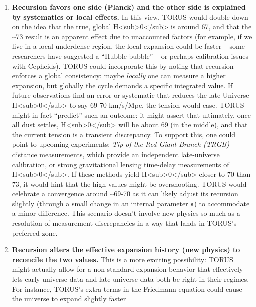 \documentclass[]{article}
\begin{document}
\begin{enumerate}
\def\labelenumi{\arabic{enumi}.}
\item
  \textbf{Recursion favors one side (Planck) and the other side is
  explained by systematics or local effects.} In this view, TORUS would
  double down on the idea that the true, global
  H\textless{}sub\textgreater{}0\textless{}/sub\textgreater{} is around
  67, and that the \textasciitilde{}73 result is an apparent effect due
  to unaccounted factors (for example, if we live in a local underdense
  region, the local expansion could be faster -- some researchers have
  suggested a ``Hubble bubble'' -- or perhaps calibration issues with
  Cepheids). TORUS could incorporate this by noting that recursion
  enforces a global consistency: maybe \emph{locally} one can measure a
  higher expansion, but globally the cycle demands a specific integrated
  value. If future observations find an error or systematic that reduces
  the late-Universe
  H\textless{}sub\textgreater{}0\textless{}/sub\textgreater{} to say
  69-70 km/s/Mpc, the tension would ease. TORUS might in fact
  ``predict'' such an outcome: it might assert that ultimately, once all
  dust settles,
  H\textless{}sub\textgreater{}0\textless{}/sub\textgreater{} will be
  about 69 (in the middle)​, and that the current tension is a transient
  discrepancy. To support this, one could point to upcoming experiments:
  \emph{Tip of the Red Giant Branch (TRGB)} distance measurements, which
  provide an independent late-universe calibration, or strong
  gravitational lensing time-delay measurements of
  H\textless{}sub\textgreater{}0\textless{}/sub\textgreater{}. If these
  methods yield
  H\textless{}sub\textgreater{}0\textless{}/sub\textgreater{} closer to
  70 than 73, it would hint that the high values might be overshooting.
  TORUS would celebrate a convergence around \textasciitilde{}69-70 as
  it can likely adjust its recursion slightly (through a small change in
  an internal parameter κ) to accommodate a minor difference​. This
  scenario doesn't involve new physics so much as a resolution of
  measurement discrepancies in a way that lands in TORUS's preferred
  zone.
\item
  \textbf{Recursion alters the effective expansion history (new physics)
  to reconcile the two values.} This is a more exciting possibility:
  TORUS might actually allow for a non-standard expansion behavior that
  effectively lets early-universe data and late-universe data both be
  right in their regimes. For instance, TORUS's extra terms in the
  Friedmann equation could cause the universe to expand slightly faster

\end{enumerate}
\end{document}
